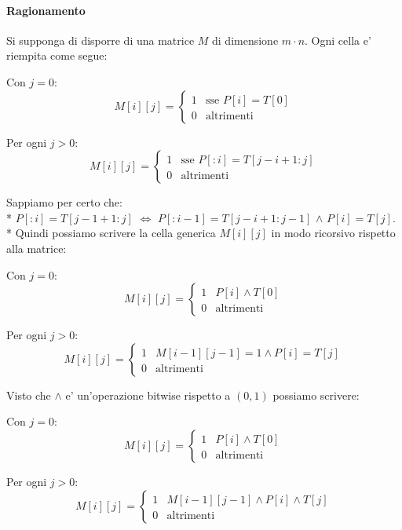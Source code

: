 \paragraph{Ragionamento}

Si supponga di disporre di una matrice $M$ di dimensione $m \cdot n$.
Ogni cella e' riempita come segue:

Con $j = 0$:
\[
    M[i][j] = 
    \begin{cases}
        1 & \text{sse $P[i] = T[0]$} \\
        0 & \text{altrimenti}
    \end{cases}
\]

Per ogni $j > 0$:
\[
    M[i][j] = 
    \begin{cases}
        1 & \text{sse $P[:i] = T[j - i + 1 : j]$} \\
        0 & \text{altrimenti}
    \end{cases}
\]

Sappiamo per certo che: \\* $P[:i] = T[j - 1 + 1 : j]$ $\Longleftrightarrow$ $P[:i - 1] = T[j - i + 1 : j - 1]$ $\land$ $P[i] = T[j]$. \\*
Quindi possiamo scrivere la cella generica $M[i][j]$ in modo ricorsivo rispetto alla matrice:

Con $j = 0$:
\[
    M[i][j] = 
    \begin{cases}
        1 & \text{$P[i] \land T[0]$} \\
        0 & \text{altrimenti}
    \end{cases}
\]

Per ogni $j > 0$:
\[
    M[i][j] = 
    \begin{cases}
        1 & \text{$M[i-1][j-1] = 1 \land P[i] = T[j]$} \\
        0 & \text{altrimenti}
    \end{cases}
\]

Visto che $\land$ e' un'operazione bitwise rispetto a $(0,1)$ possiamo scrivere:

Con $j = 0$:
\[
    M[i][j] = 
    \begin{cases}
        1 & \text{$P[i] \land T[0]$} \\
        0 & \text{altrimenti}
    \end{cases}
\]

Per ogni $j > 0$:
\[
    M[i][j] = 
    \begin{cases}
        1 & \text{$M[i-1][j-1] \land P[i] \land T[j]$} \\
        0 & \text{altrimenti}
    \end{cases}
\]

